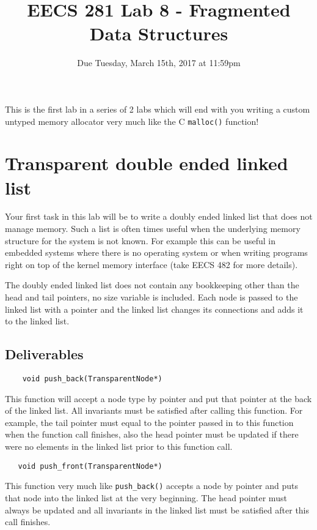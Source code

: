 \documentclass{article}
\begin{document}
\title{\textbf{EECS 281 Lab 8 - Fragmented Data Structures}}
\author{Due Tuesday, March 15th, 2017 at 11:59pm}
\date{}
\maketitle
{}
{
   \pagestyle{empty}
}
\thispagestyle{firststyle}

This is the first lab in a series of 2 labs which will end with you writing a
custom untyped memory allocator very much like the C \texttt{malloc()} function!

\section{Transparent double ended linked list}
Your first task in this lab will be to write a doubly ended linked list that
does not manage memory.  Such a list is often times useful when the underlying
memory structure for the system is not known.  For example this can be useful
in embedded systems where there is no operating system or when writing
programs right on top of the kernel memory interface (take EECS 482 for more
details).

The doubly ended linked list does not contain any bookkeeping other than the
head and tail pointers, no size variable is included.  Each node is passed to
the linked list with a pointer and the linked list changes its connections and
adds it to the linked list.

\subsection{Deliverables}

\begin{lstlisting}
    void push_back(TransparentNode*)
\end{lstlisting}
This function will accept a node type by pointer and put that pointer at the
back of the linked list.  All invariants must be satisfied after calling this
function.  For example, the tail pointer must equal to the pointer passed in
to this function when the function call finishes, also the head pointer must
be updated if there were no elements in the linked list prior to this function
call.

\begin{lstlisting}
   void push_front(TransparentNode*)
\end{lstlisting}
This function very much like \texttt{push\_back()} accepts a node by pointer
and puts that node into the linked list at the very beginning.  The head
pointer must always be updated and all invariants in the linked list must be
satisfied after this call finishes.
\end{document}

